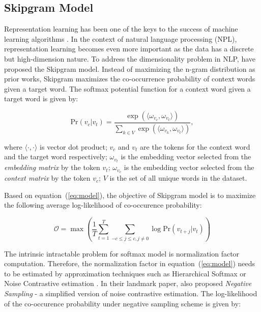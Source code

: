 \documentclass[letterpaper]{article}
\begin{document}
        \subsection{Skipgram Model}
            Representation learning has been one of the keys to the success of machine learning 
            algorithms \cite{bengioreprev}. In the context of natural language processing (NPL),
            representation learning becomes even more important as the data has a discrete but
            high-dimension nature. To address the dimensionality problem in NLP, \citeauthor{skipgram} have
            proposed the Skipgram model. Instead of maximizing the n-gram distribution
            as prior works, Skipgram maximizes the co-occurrence probability of context words given a
            target word. The softmax potential function for a context word given a target 
            word is given by:

            \begin{equation}
                \label{eq:model}
                \mbox{Pr} (v_c | v_t) = \frac{\exp{( \langle \omega_{v_c} ,  \omega_{v_t} \rangle )}}{\sum_{k \in V} \exp{( \langle \omega_{v_k} ,  \omega_{v_t} \rangle )}},
            \end{equation}
            
            \noindent
            where $ \langle \cdot ,  \cdot \rangle $ is vector dot product; $ v_c $ and $ v_t $ are the
            tokens for the context word and the target word respectively; $\omega_{v_t}$ is the embedding
            vector selected from the \emph{embedding matrix} by the token $v_t$; $\omega_{v_c}$ is the
            embedding vector selected from the \emph{context matrix} by the token $v_c$; $V$ is the
            set of all unique words in the dataset.

            Based on equation~(\ref{eq:model}), the objective of Skipgram model is to maximize the following
            average log-likelihood of co-occurence probability:

            \begin{equation}
                \label{eq:avgloglikelihood}
                \mathcal{O} = \max \left( \frac{1}{T} \sum_{t=1}^{T} \sum_{-c \leq j \leq c, j \neq 0} \log \mbox{Pr} (v_{t+j} | v_t) \right)
            \end{equation}

            The intrinsic intractable problem for softmax model is normalization factor computation. 
            Therefore, the normalization factor in equation~(\ref{eq:model}) needs to be estimated by 
            approximation techniques such as Hierarchical Softmax \cite{hs} or Noise Contrastive estimation
            \cite{nce}. In their landmark paper, \citeauthor{skipgram} also proposed \emph{Negative Sampling} - a 
            simplified version of noise contrastive estimation. The log-likelihood of the co-occurence probability
            under negative sampling scheme is given by:
\end{document}
